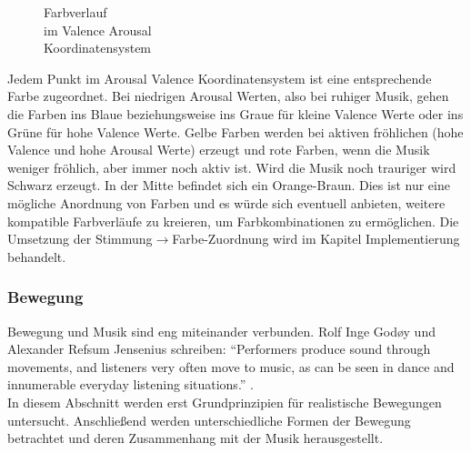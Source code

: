 \documentclass[11pt,a4paper]{article}
\begin{document}
\begin{wrapfigure}{l}{0.5\linewidth}
\captionsetup{justification=centering}
\caption[Farbverlauf im Valence Arousal Koordinatensystem]{Farbverlauf\\im Valence Arousal\\Koordinatensystem}
\label{fig:Farbverlauf}
\end{wrapfigure}
\noindent
Jedem Punkt im Arousal Valence Koordinatensystem ist eine entsprechende Farbe zugeordnet. Bei niedrigen Arousal Werten, also bei ruhiger Musik, gehen die Farben ins Blaue beziehungsweise ins Graue für kleine Valence Werte oder ins Grüne für hohe Valence Werte. Gelbe Farben werden bei aktiven fröhlichen (hohe Valence und hohe Arousal Werte) erzeugt und rote Farben, wenn die Musik weniger fröhlich, aber immer noch aktiv ist. Wird die Musik noch trauriger wird Schwarz erzeugt. In der Mitte befindet sich ein Orange-Braun. Dies ist nur eine mögliche Anordnung von Farben und es würde sich eventuell anbieten, weitere kompatible Farbverläufe zu kreieren, um Farbkombinationen zu ermöglichen. Die Umsetzung der Stimmung$ \rightarrow $Farbe-Zuordnung wird im Kapitel Implementierung behandelt.

\subsubsection*{Bewegung}
Bewegung und Musik sind eng miteinander verbunden. Rolf Inge God{\o}y und Alexander Refsum Jensenius schreiben: ``Performers produce sound through movements, and listeners very often move to music, as can be seen in dance and innumerable everyday listening situations.'' \cite[S. 1]{905eee055abaf2a4f198ce11f35362a8963f61d552297a02dfc8fbc0c4f78679}.\\
In diesem Abschnitt werden erst Grundprinzipien für realistische Bewegungen untersucht. Anschließend werden unterschiedliche Formen der Bewegung betrachtet und deren Zusammenhang mit der Musik herausgestellt.
\end{document}
